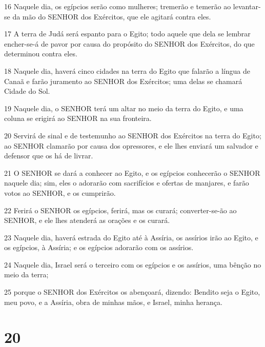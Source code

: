 \par 16 Naquele dia, os egípcios serão como mulheres; tremerão e temerão ao levantar-se da mão do SENHOR dos Exércitos, que ele agitará contra eles.
\par 17 A terra de Judá será espanto para o Egito; todo aquele que dela se lembrar encher-se-á de pavor por causa do propósito do SENHOR dos Exércitos, do que determinou contra eles.
\par 18 Naquele dia, haverá cinco cidades na terra do Egito que falarão a língua de Canaã e farão juramento ao SENHOR dos Exércitos; uma delas se chamará Cidade do Sol.
\par 19 Naquele dia, o SENHOR terá um altar no meio da terra do Egito, e uma coluna se erigirá ao SENHOR na sua fronteira.
\par 20 Servirá de sinal e de testemunho ao SENHOR dos Exércitos na terra do Egito; ao SENHOR clamarão por causa dos opressores, e ele lhes enviará um salvador e defensor que os há de livrar.
\par 21 O SENHOR se dará a conhecer ao Egito, e os egípcios conhecerão o SENHOR naquele dia; sim, eles o adorarão com sacrifícios e ofertas de manjares, e farão votos ao SENHOR, e os cumprirão.
\par 22 Ferirá o SENHOR os egípcios, ferirá, mas os curará; converter-se-ão ao SENHOR, e ele lhes atenderá as orações e os curará.
\par 23 Naquele dia, haverá estrada do Egito até à Assíria, os assírios irão ao Egito, e os egípcios, à Assíria; e os egípcios adorarão com os assírios.
\par 24 Naquele dia, Israel será o terceiro com os egípcios e os assírios, uma bênção no meio da terra;
\par 25 porque o SENHOR dos Exércitos os abençoará, dizendo: Bendito seja o Egito, meu povo, e a Assíria, obra de minhas mãos, e Israel, minha herança.

\chapter{20}

